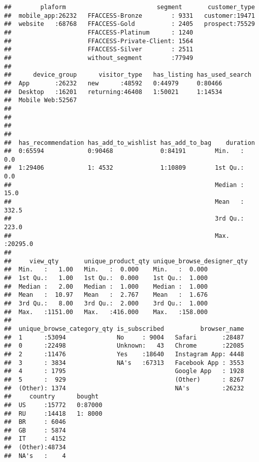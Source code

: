 \documentclass[
]{book}
\begin{document}
\begin{verbatim}
##        plaform                         segment       customer_type  
##  mobile_app:26232   FFACCESS-Bronze        : 9331   customer:19471  
##  website   :68768   FFACCESS-Gold          : 2405   prospect:75529  
##                     FFACCESS-Platinum      : 1240                   
##                     FFACCESS-Private-Client: 1564                   
##                     FFACCESS-Silver        : 2511                   
##                     without_segment        :77949                   
##                                                                     
##      device_group      visitor_type   has_listing has_used_search
##  App       :26232   new      :48592   0:44979     0:80466        
##  Desktop   :16201   returning:46408   1:50021     1:14534        
##  Mobile Web:52567                                                
##                                                                  
##                                                                  
##                                                                  
##                                                                  
##  has_recommendation has_add_to_wishlist has_add_to_bag    duration      
##  0:65594            0:90468             0:84191        Min.   :    0.0  
##  1:29406            1: 4532             1:10809        1st Qu.:    0.0  
##                                                        Median :   15.0  
##                                                        Mean   :  332.5  
##                                                        3rd Qu.:  223.0  
##                                                        Max.   :20295.0  
##                                                                         
##     view_qty       unique_product_qty unique_browse_designer_qty
##  Min.   :   1.00   Min.   :  0.000    Min.   :  0.000           
##  1st Qu.:   1.00   1st Qu.:  0.000    1st Qu.:  1.000           
##  Median :   2.00   Median :  1.000    Median :  1.000           
##  Mean   :  10.97   Mean   :  2.767    Mean   :  1.676           
##  3rd Qu.:   8.00   3rd Qu.:  2.000    3rd Qu.:  1.000           
##  Max.   :1151.00   Max.   :416.000    Max.   :158.000           
##                                                                 
##  unique_browse_category_qty is_subscribed          browser_name  
##  1      :53094              No     : 9004   Safari       :28487  
##  0      :22498              Unknown:   43   Chrome       :22085  
##  2      :11476              Yes    :18640   Instagram App: 4448  
##  3      : 3834              NA's   :67313   Facebook App : 3553  
##  4      : 1795                              Google App   : 1928  
##  5      :  929                              (Other)      : 8267  
##  (Other): 1374                              NA's         :26232  
##     country      bought   
##  US     :15772   0:87000  
##  RU     :14418   1: 8000  
##  BR     : 6046            
##  GB     : 5874            
##  IT     : 4152            
##  (Other):48734            
##  NA's   :    4
\end{verbatim}
\end{document}
